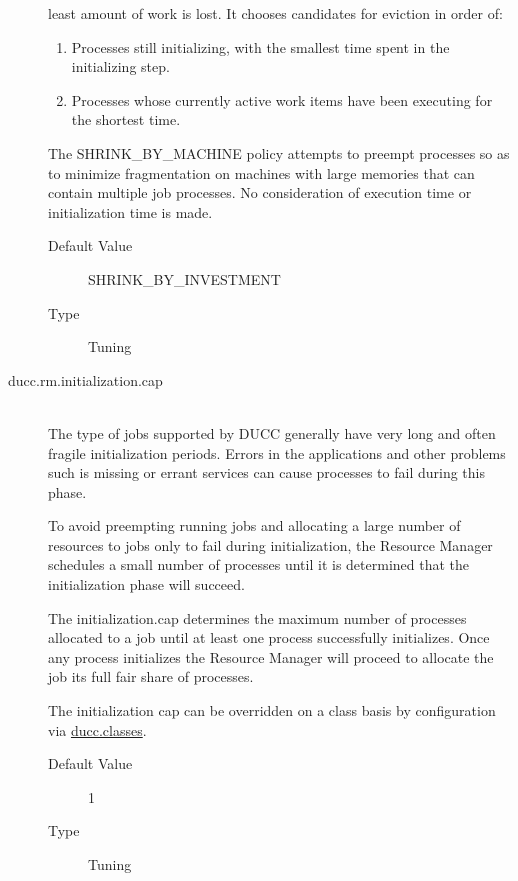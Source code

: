 \begin{description}
          least amount of work is lost. It chooses candidates for eviction in order of: 
          \begin{enumerate}
            \item Processes still initializing, with the smallest time spent in the initializing step. 
            \item Processes whose currently active work items have been executing for the shortest 
              time.
            \end{enumerate}
            The SHRINK\_BY\_MACHINE policy attempts to preempt processes so as to minimize 
            fragmentation on machines with large memories that can contain multiple job processes. 
            No consideration of execution time or initialization time is made.             
          \begin{description}
            \item[Default Value] SHRINK\_BY\_INVESTMENT 
            \item[Type] Tuning 
          \end{description}
          

        \item[ducc.rm.initialization.cap] \hfill \\
          The type of jobs supported by DUCC generally have very long and often fragile 
          initialization periods. Errors in the applications and other problems such is missing or 
          errant services can cause processes to fail during this phase. 
          
          To avoid preempting running jobs and allocating a large number of resources to jobs only 
          to fail during initialization, the Resource Manager schedules a small number of processes 
          until it is determined that the initialization phase will succeed. 
          
          The initialization.cap determines the maximum number of processes allocated to a job 
          until at least one process successfully initializes. Once any process initializes the Resource 
          Manager will proceed to allocate the job its full fair share of processes. 
          
          The initialization cap can be overridden on a class basis by configuration via           
          \hyperref[sec:ducc.classes]{ducc.classes}.

          \begin{description}
            \item[Default Value] 1
            \item[Type] Tuning 
          \end{description}
          


\end{description}
